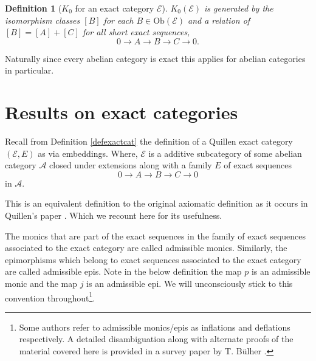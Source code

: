 \documentclass[12pt]{report}
\numberwithin{equation}{section}
\newtheorem{definition}[dummy]{Definition}
\begin{document}
	\begin{definition}[$K_0$ for an exact category $\mathcal{E}$]\label{def:k0exact}
			$K_0(\mathcal E)$ is generated by the isomorphism classes $[B]$ for each $B \in \mathrm{Ob}(\mathcal{E})$ and a relation of $[B]=[A]+[C]$ for all short exact sequences, \[ 0 \to A \to B \to C \to 0.\]
	\end{definition}
		
	Naturally since every abelian category is exact this applies for abelian categories in particular.		
		
	\section{Results on exact categories}
			
	Recall from Definition \ref{defexactcat} the definition of a Quillen exact category $(\mathcal{E}, E)$ as via embeddings. Where, $\mathcal{E}$ is a additive subcategory of some abelian category $\mathcal{A}$ closed under extensions along with a family $E$ of exact sequences \[ 0 \to A \to B \rightarrow C \to 0 \] in $\mathcal{A}$. 
		
	This is an equivalent definition to the original axiomatic definition as it occurs in Quillen's paper \cite{quillenhigherktheoryI}. Which we recount here for its usefulness.
		
		The monics that are part of the exact sequences in the family of exact sequences associated to the exact category are called admissible monics. Similarly, the epimorphisms which belong to exact sequences associated to the exact category are called admissible epis. Note in the below definition the map \(p\) is an admissible monic and the map \(j\) is an admissible epi. We will unconsciously stick to this convention throughout\footnote{Some authors refer to admissible monics/epis as inflations and deflations respectively. A detailed disambiguation along with alternate proofs of the material covered here is provided in a survey paper by T. B{\"u}lher \cite{BUHLER20101}. }.
		
\end{document}
